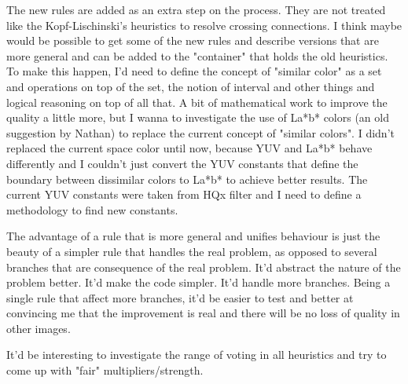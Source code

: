 The new rules are added as an extra step on the process. They are not treated
like the Kopf-Lischinski's heuristics to resolve crossing connections. I think
maybe would be possible to get some of the new rules and describe versions that
are more general and can be added to the "container" that holds the old
heuristics. To make this happen, I'd need to define the concept of "similar
color" as a set and operations on top of the set, the notion of interval and
other things and logical reasoning on top of all that. A bit of mathematical
work to improve the quality a little more, but I wanna to investigate the use of
La*b* colors (an old suggestion by Nathan) to replace the current concept of
"similar colors". I didn't replaced the current space color until now, because
YUV and La*b* behave differently and I couldn't just convert the YUV constants
that define the boundary between dissimilar colors to La*b* to achieve better
results. The current YUV constants were taken from HQx filter and I need to
define a methodology to find new constants.

The advantage of a rule that is more general and unifies behaviour is just the
beauty of a simpler rule that handles the real problem, as opposed to several
branches that are consequence of the real problem. It'd abstract the nature of
the problem better. It'd make the code simpler. It'd handle more branches. Being
a single rule that affect more branches, it'd be easier to test and better at
convincing me that the improvement is real and there will be no loss of quality
in other images.

It'd be interesting to investigate the range of voting in all heuristics and try
to come up with "fair" multipliers/strength.

